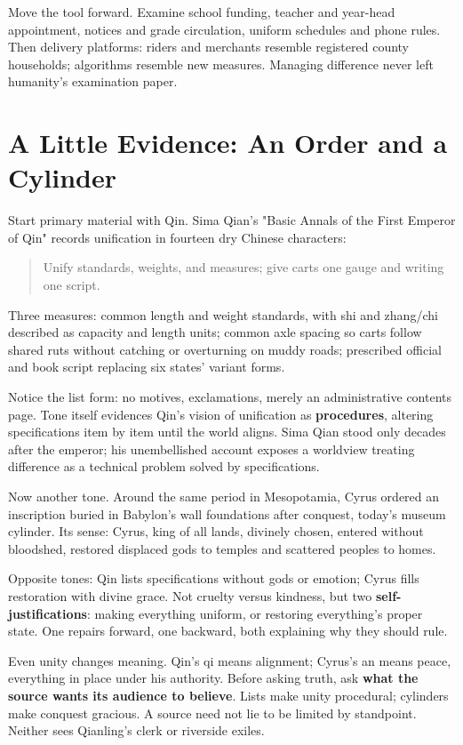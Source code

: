 Move the tool forward. Examine school funding, teacher and year-head appointment, notices and grade circulation, uniform schedules and phone rules. Then delivery platforms: riders and merchants resemble registered county households; algorithms resemble new measures. Managing difference never left humanity's examination paper.

\section[Evidence: An Order and a Cylinder]{A Little Evidence: An Order and a Cylinder}
Start primary material with Qin. Sima Qian's "Basic Annals of the First Emperor of Qin" records unification in fourteen dry Chinese characters:

\begin{quote}
Unify standards, weights, and measures; give carts one gauge and writing one script.
\end{quote}
Three measures: common length and weight standards, with shi and zhang/chi described as capacity and length units; common axle spacing so carts follow shared ruts without catching or overturning on muddy roads; prescribed official and book script replacing six states' variant forms.

Notice the list form: no motives, exclamations, merely an administrative contents page. Tone itself evidences Qin's vision of unification as \textbf{procedures}, altering specifications item by item until the world aligns. Sima Qian stood only decades after the emperor; his unembellished account exposes a worldview treating difference as a technical problem solved by specifications.

Now another tone. Around the same period in Mesopotamia, Cyrus ordered an inscription buried in Babylon's wall foundations after conquest, today's museum cylinder. Its sense: Cyrus, king of all lands, divinely chosen, entered without bloodshed, restored displaced gods to temples and scattered peoples to homes.

Opposite tones: Qin lists specifications without gods or emotion; Cyrus fills restoration with divine grace. Not cruelty versus kindness, but two \textbf{self-justifications}: making everything uniform, or restoring everything's proper state. One repairs forward, one backward, both explaining why they should rule.

Even unity changes meaning. Qin's qi means alignment; Cyrus's an means peace, everything in place under his authority. Before asking truth, ask \textbf{what the source wants its audience to believe}. Lists make unity procedural; cylinders make conquest gracious. A source need not lie to be limited by standpoint. Neither sees Qianling's clerk or riverside exiles.

